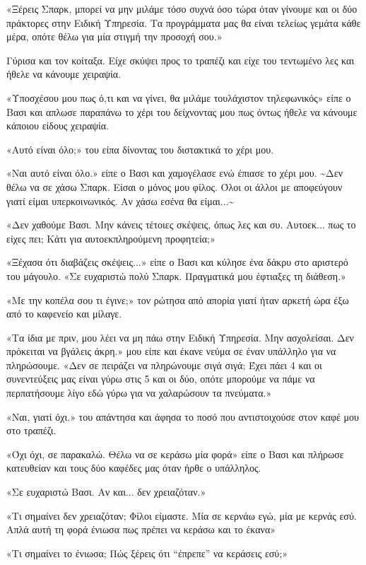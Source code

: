 \documentclass[12pt,twoside, openany]{book}
\begin{document}
«Ξέρεις Σπαρκ, μπορεί να μην μιλάμε τόσο συχνά όσο τώρα όταν γίνουμε και οι δύο πράκτορες στην Ειδική Υπηρεσία. Τα προγράμματα μας θα είναι τελείως γεμάτα κάθε μέρα, οπότε θέλω για μία στιγμή την προσοχή σου.»

Γύρισα και τον κοίταξα. Είχε σκύψει προς το τραπέζι και είχε του τεντωμένο λες και ήθελε να κάνουμε χειραψία.

«Υποσχέσου μου πως ό,τι και να γίνει, θα μιλάμε τουλάχιστον τηλεφωνικός» είπε ο Βασι και απλωσε παραπάνω το χέρι του δείχνοντας μου πως όντως ήθελε να κάνουμε κάποιου είδους χειραψία.

«Αυτό είναι όλο;» του είπα δίνοντας του διστακτικά το χέρι μου.

«Ναι αυτό είναι όλο.» είπε ο Βασι και χαμογέλασε ενώ έπιασε το χέρι μου. \textasciitilde Δεν θέλω να σε χάσω Σπαρκ. Είσαι ο μόνος μου φίλος. Όλοι οι άλλοι με αποφεύγουν γιατί είμαι υπερκοινωνικός. Αν χάσω εσένα θα είμαι...\textasciitilde 

«Δεν χαθούμε Βασι. Μην κάνεις τέτοιες σκέψεις, όπως λες και συ. Αυτοεκ... πως το είχες πει; Κάτι για αυτοεκπληρούμενη προφητεία;»

«Ξέχασα ότι διαβάζεις σκέψεις...» είπε ο Βασι και κύλησε ένα δάκρυ στο αριστερό του μάγουλο. «Σε ευχαριστώ πολύ Σπαρκ. Πραγματικά μου έφτιαξες τη διάθεση.»

«Με την κοπέλα σου τι έγινε;» τον ρώτησα από απορία γιατί ήταν αρκετή ώρα έξω από το καφενείο και μίλαγε.

«Τα ίδια με πριν, μου λέει να μη πάω στην Ειδική Υπηρεσία. Μην ασχολείσαι. Δεν πρόκειται να βγάλεις άκρη.» μου είπε και έκανε νεύμα σε έναν υπάλληλο για να πληρώσουμε. «Δεν σε πειράζει να πληρώνουμε σιγά σιγά; Έχει πάει 4 και οι συνεντεύξεις μας είναι γύρω στις 5 και οι δύο, οπότε μπορούμε να πάμε να περπατήσουμε λίγο εδώ γύρω για να χαλαρώσουν τα πνεύματα.»

«Ναι, γιατί όχι.» του απάντησα και άφησα το ποσό που αντιστοιχούσε στον καφέ μου στο τραπέζι.

«Όχι όχι, σε παρακαλώ. Θέλω να σε κεράσω μία φορά» είπε ο Βασι και πλήρωσε κατευθείαν και τους δύο καφέδες μας όταν ήρθε ο υπάλληλος.

«Σε ευχαριστώ Βασι. Αν και... δεν χρειαζόταν.»

«Τι σημαίνει δεν χρειαζόταν; Φίλοι είμαστε. Μία σε κερνάω εγώ, μία με κερνάς εσύ. Απλά αυτή τη φορά ένιωσα πως πρέπει να κεράσω και το έκανα»

«Τι σημαίνει το ένιωσα; Πώς ξέρεις ότι “έπρεπε” να κεράσεις εσύ;»
\end{document}
